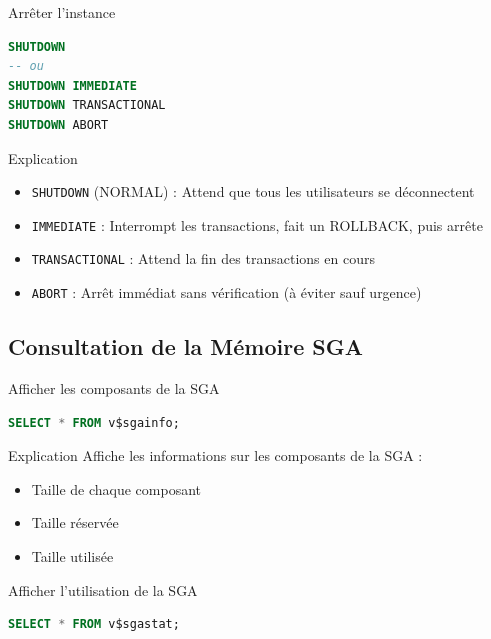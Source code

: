 \documentclass[12pt,a4paper]{article}
\begin{document}
\begin{commande}{Arrêter l'instance}
\begin{lstlisting}[language=SQL]
SHUTDOWN
-- ou
SHUTDOWN IMMEDIATE
SHUTDOWN TRANSACTIONAL
SHUTDOWN ABORT
\end{lstlisting}
\end{commande}

\begin{explication}{Explication}
\begin{itemize}
    \item \texttt{SHUTDOWN} (NORMAL) : Attend que tous les utilisateurs se déconnectent
    \item \texttt{IMMEDIATE} : Interrompt les transactions, fait un ROLLBACK, puis arrête
    \item \texttt{TRANSACTIONAL} : Attend la fin des transactions en cours
    \item \texttt{ABORT} : Arrêt immédiat sans vérification (à éviter sauf urgence)
\end{itemize}
\end{explication}

\subsection{Consultation de la Mémoire SGA}

\begin{commande}{Afficher les composants de la SGA}
\begin{lstlisting}[language=SQL]
SELECT * FROM v$sgainfo;
\end{lstlisting}
\end{commande}

\begin{explication}{Explication}
Affiche les informations sur les composants de la SGA :
\begin{itemize}
    \item Taille de chaque composant
    \item Taille réservée
    \item Taille utilisée
\end{itemize}
\end{explication}

\begin{commande}{Afficher l'utilisation de la SGA}
\begin{lstlisting}[language=SQL]
SELECT * FROM v$sgastat;
\end{lstlisting}
\end{commande}
\end{document}
